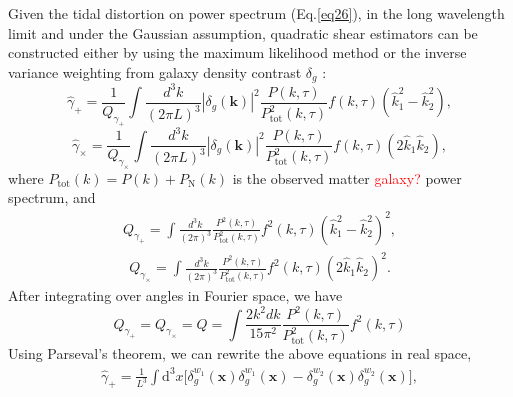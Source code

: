 \documentclass[aps,prd,twocolumn,showpacs,superscriptaddress,groupedaddress,nofootinbib]{revtex4}  %
\newcommand{\mr}{\mathrm}
\renewcommand{\d}{\mathrm{d}}
\begin{document}
Given the tidal distortion on power spectrum (Eq.\ref{eq26}), in the long wavelength limit and under the Gaussian assumption, 
quadratic shear estimators can be constructed either by using the maximum likelihood method\cite{2008:lu}
or the inverse variance weighting from galaxy density contrast $\delta_g$ 
\cite{2010lu,2012bucher}:
\begin{equation}
\hat{\gamma}_+=\frac{1}{Q_{\gamma_+}}\int\frac{d^3k}{(2\pi L)^3}
|{\delta}_g(\bm{k})|^2
\frac{P(k,\tau)}{P_{\mr{tot}}^2(k,\tau)}f(k,\tau)(\hat{k}_1^2-\hat{k}_2^2),
\end{equation}
\begin{equation}
\hat{\gamma}_\times=\frac{1}{Q_{\gamma_\times}}\int\frac{d^3k}{(2\pi L)^3}
|{\delta}_g(\bm{k})|^2
\frac{P(k,\tau)}{P_{\mr{tot}}^2(k,\tau)}f(k,\tau)(2\hat{k}_1\hat{k}_2),
\end{equation}
where $P_\mr{tot}(k)=P(k)+P_\mr{N}(k)$ is the observed matter \textcolor{red}{galaxy?} power spectrum, and
\begin{eqnarray}
Q_{\gamma_+}=\int\frac{d^3k}{(2\pi)^3}
\frac{P^2(k,\tau)}{P_{\mr{tot}}^2(k,\tau)}f^2(k,\tau)(\hat{k}_1^2-\hat{k}_2^2)^2,
\end{eqnarray}
\begin{eqnarray}
Q_{\gamma_\times}=\int\frac{d^3k}{(2\pi)^3}
\frac{P^2(k,\tau)}{P_{\mr{tot}}^2(k,\tau)}
f^2(k,\tau)
(2\hat{k}_1\hat{k}_2)^2.
\end{eqnarray}
After integrating over angles in Fourier space, we have
\begin{equation}
Q_{\gamma_+}=Q_{\gamma_\times}=Q=\int\frac{2k^2dk}{15\pi^2}\frac{P^2(k,\tau)}{P_{\mr{tot}}^2(k,\tau)}
f^2(k,\tau)
\label{eq:Q}
\end{equation}
Using Parseval's theorem, we can rewrite the  above equations in real space,
\begin{eqnarray}
\label{eq36}
\hat{\gamma}_+=\frac{1}{L^3}\int\d^3x
\big[{\delta}^{w_1}_g(\bm{x}){\delta}^{w_1}_g(\bm{x})-
{\delta}^{w_2}_g(\bm{x}){\delta}^{w_2}_g(\bm{x})\big],
\end{eqnarray}
\end{document}
